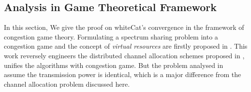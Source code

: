 \subsection{Analysis in Game Theoretical Framework}
\label{game}
In this section, We give the proof on whiteCat's convergence in the framework of congestion game theory.
Formulating a spectrum sharing problem into a congestion game and the concept of \textit{virtual resources} are firstly proposed in \cite{allerton08_liu}.
This work reversely engineers the distributed channel allocation schemes proposed in \cite{babadi_08, Ko_DistributedCA}, \ie unifies the algorithms with congestion game.
But the problem analysed in~\cite{allerton08_liu} assume the transmission power is identical, which is a major difference from the channel allocation problem discussed here. 

